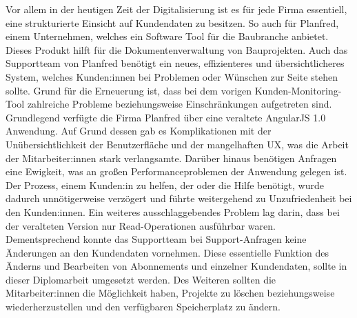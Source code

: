 Vor allem in der heutigen Zeit der Digitalisierung ist es f\"ur jede Firma essentiell, eine strukturierte Einsicht auf Kundendaten zu besitzen. So auch für Planfred, einem Unternehmen, welches ein Software Tool für die Baubranche anbietet. Dieses Produkt hilft für die Dokumentenverwaltung von Bauprojekten. Auch das Supportteam von Planfred benötigt ein neues, effizienteres und \"ubersichtlicheres System, welches Kunden:innen bei Problemen oder W\"unschen zur Seite stehen sollte. Grund für die Erneuerung ist, dass bei dem vorigen Kunden-Monitoring-Tool zahlreiche Probleme beziehungsweise Einschränkungen aufgetreten sind.
\newline
Grundlegend verf\"ugte die Firma Planfred \"uber eine veraltete AngularJS 1.0 Anwendung. Auf Grund dessen gab es Komplikationen mit der Un\"ubersichtlichkeit der Benutzerfläche und der mangelhaften UX, was die Arbeit der Mitarbeiter:innen stark verlangsamte. Dar\"uber hinaus benötigen Anfragen eine Ewigkeit, was an großen Performanceproblemen der Anwendung gelegen ist. Der Prozess, einem Kunden:in zu helfen, der oder die Hilfe benötigt, wurde dadurch unnötigerweise verzögert und f\"uhrte weitergehend zu Unzufriedenheit bei den Kunden:innen.
\newline
Ein weiteres ausschlaggebendes Problem lag darin, dass bei der veralteten Version nur Read-Operationen ausf\"uhrbar waren. Dementsprechend konnte das Supportteam bei Support-Anfragen keine Änderungen an den Kundendaten vornehmen. Diese essentielle Funktion des Änderns und Bearbeiten von Abonnements und einzelner Kundendaten, sollte in dieser Diplomarbeit umgesetzt werden. Des Weiteren sollten die Mitarbeiter:innen die Möglichkeit haben, Projekte zu löschen beziehungsweise wiederherzustellen und den verf\"ugbaren Speicherplatz zu ändern.